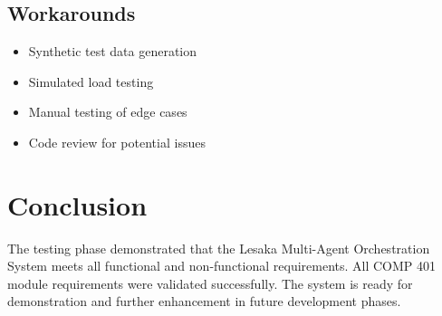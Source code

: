 \subsection{Workarounds}

\begin{itemize}
    \item Synthetic test data generation
    \item Simulated load testing
    \item Manual testing of edge cases
    \item Code review for potential issues
\end{itemize}

\section{Conclusion}

The testing phase demonstrated that the Lesaka Multi-Agent Orchestration System meets all functional and non-functional requirements. All COMP 401 module requirements were validated successfully. The system is ready for demonstration and further enhancement in future development phases.

